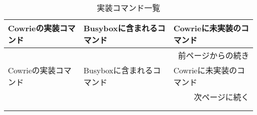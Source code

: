 \begin{longtable}{llp{50mm}}
  \caption{実装コマンド一覧}
  \label{table:command} \\
  \hline
  Cowrieの実装コマンド & Busyboxに含まれるコマンド & Cowrieに未実装のコマンド \\ \hline\hline
  \endfirsthead
  \multicolumn{3}{r}{前ページからの続き} \\ \hline
  Cowrieの実装コマンド　& Busyboxに含まれるコマンド & Cowrieに未実装のコマンド \\ \hline\hline
  \endhead
  \hline
  \multicolumn{3}{r}{次ページに続く} \\
  \endfoot
  \hline
  \multicolumn{3}{r}{以上} \\
  \endlastfoot


\end{longtable}

